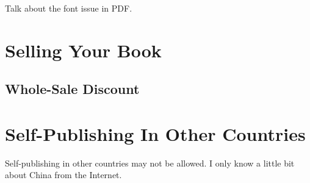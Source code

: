 Talk about the font issue in PDF.






\section{Selling Your Book}



\subsection{Whole-Sale Discount} 





\section{Self-Publishing In Other Countries}

Self-publishing in other countries may not be allowed. 
I only know a little bit about China from the Internet.




